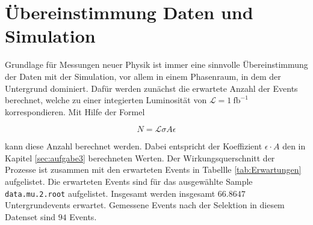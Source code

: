 \section{Übereinstimmung Daten und Simulation}
\label{sec:aufgabe6}

Grundlage für Messungen neuer Physik ist immer eine sinnvolle Übereinstimmung
der Daten mit der Simulation, vor allem in einem Phasenraum, in dem der
Untergrund dominiert. Dafür werden zunächst die erwartete Anzahl der Events
berechnet, welche zu einer integierten Luminosität von
$\mathcal{L} = \SI{1}{\femto\barn}^{-1}$ korrespondieren. Mit Hilfe der Formel

\begin{equation}
N = \mathcal{L} \sigma A \epsilon
\label{eqn:erwartung}
\end{equation}

kann diese Anzahl berechnet werden. Dabei entspricht der Koeffizient
$\epsilon \cdot A$ den in Kapitel \ref{sec:aufgabe3}
berechneten Werten. Der Wirkungsquerschnitt der Prozesse ist zusammen mit
den erwarteten Events in Tabellle \ref{tab:Erwartungen} aufgelistet. Die erwarteten
Events sind für das ausgewählte Sample \texttt{data.mu.2.root} aufgelistet. Insgesamt
werden insgesamt $66.8647$ Untergrundevents erwartet. Gemessene Events nach der
Selektion in diesem Datenset sind $94$ Events.

